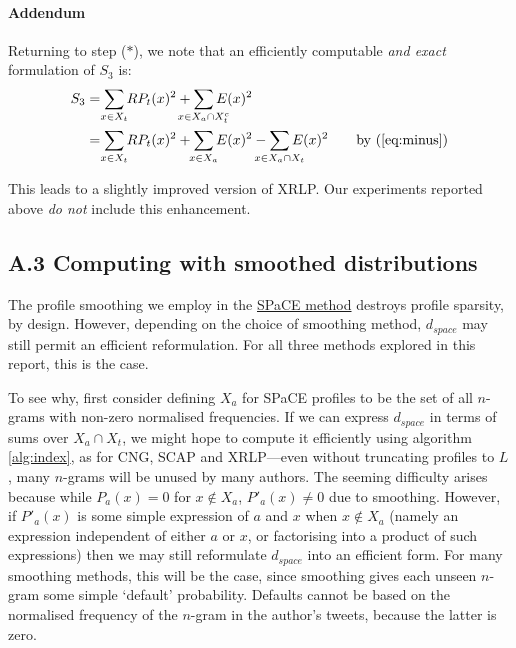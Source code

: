 \documentclass[twocolumn,10pt]{article}
\begin{document}
\paragraph{Addendum}
Returning to step ($*$), we note that an efficiently computable
\emph{and exact} formulation of $S_3$ is:
\begin{align*}
S_3
&=
    \smashoperator{\sum_{x \in X_t}} RP_t(x)^2
    + \smashoperator{\sum_{x \in X_a \cap X_t^c}} E(x)^2
\\
&=
    \smashoperator{\sum_{x \in X_t}} RP_t(x)^2
    + \smashoperator{\sum_{x \in X_a}} E(x)^2
    - \smashoperator{\sum_{x \in X_a \cap X_t}} E(x)^2
\tag*{by (\ref{eq:minus})}
\end{align*}

This leads to a slightly improved version of XRLP. Our experiments
reported above \emph{do not} include this enhancement.




\subsection*{A.3 Computing with smoothed distributions}
\label{A3}

The profile smoothing we employ in the
\hyperlink{par:space}{SPaCE method} destroys profile sparsity,
by design. However, depending on the choice of smoothing method,
$d_{space}$ may still permit an efficient reformulation.
For all three methods explored in this report, this is the case.

To see why, first consider defining $X_a$ for SPaCE profiles to
be the set of all $n$-grams with non-zero normalised frequencies.
If we can express $d_{space}$ in terms of sums over $X_a \cap X_t$,
we might hope to compute it efficiently using algorithm \ref{alg:index},
as for CNG, SCAP and XRLP---even without truncating profiles to $L$,
many $n$-grams will be unused by many authors.
The seeming difficulty arises because while $P_a(x) = 0$ for
$x \notin X_a$, $P'_a(x) \neq 0$ due to smoothing.
However, if $P'_a(x)$ is some simple expression of
$a$ and $x$ when $x \notin X_a$ (namely an expression independent of
either $a$ or $x$, or factorising into a product of such expressions)
then we may still reformulate $d_{space}$ into an efficient form.
For many smoothing methods, this will be the case, since smoothing
gives each unseen $n$-gram some simple `default' probability.
Defaults cannot be based on the normalised frequency of the $n$-gram
in the author's tweets, because the latter is zero.
\end{document}
